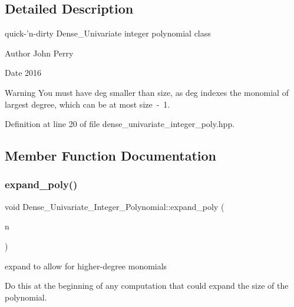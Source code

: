 \subsection{Detailed Description}
quick-\/'n-\/dirty Dense\+\_\+\+Univariate integer polynomial class 

\begin{DoxyAuthor}{Author}
John Perry 
\end{DoxyAuthor}
\begin{DoxyDate}{Date}
2016 
\end{DoxyDate}
\begin{DoxyWarning}{Warning}
You must have {\ttfamily deg} smaller than {\ttfamily size}, as {\ttfamily deg} indexes the monomial of largest degree, which can be at most {\ttfamily size~-\/~1}. 
\end{DoxyWarning}


Definition at line 20 of file dense\+\_\+univariate\+\_\+integer\+\_\+poly.\+hpp.



\subsection{Member Function Documentation}
\mbox{\label{class_dense___univariate___integer___polynomial_a58fc0f5eefa5d11cdd17d3453eb9ac0d}} 
\subsubsection{\texorpdfstring{expand\+\_\+poly()}{expand\_poly()}}
{\footnotesize\ttfamily void Dense\+\_\+\+Univariate\+\_\+\+Integer\+\_\+\+Polynomial\+::expand\+\_\+poly (\begin{DoxyParamCaption}\item[{D\+E\+G\+\_\+\+T\+Y\+PE}]{n }\end{DoxyParamCaption})}



expand to allow for higher-\/degree monomials 

Do this at the beginning of any computation that could expand the size of the polynomial. 

